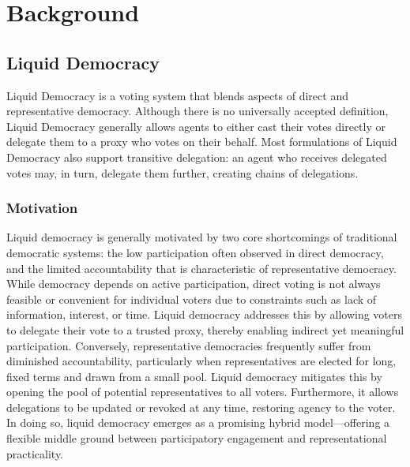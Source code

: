 \graphicspath{{../figures/}}

\chapter{Background}
\label{chap:background}

\section{Liquid Democracy}

Liquid Democracy is a voting system that blends aspects of direct and representative democracy. Although there is no universally accepted definition, Liquid Democracy generally allows agents to either cast their votes directly or delegate them to a proxy who votes on their behalf. Most formulations of Liquid Democracy also support transitive delegation: an agent who receives delegated votes may, in turn, delegate them further, creating chains of delegations. \cite{degraveResolvingMultiproxyTransitive2014, boldiViscousDemocracySocial2011, revel2022liquid, bersetcheGeneralizingLiquidDemocracy2022}

\subsection{Motivation}

Liquid democracy is generally motivated by two core shortcomings of traditional democratic systems: the low participation often observed in direct democracy, and the limited accountability that is characteristic of representative democracy. \cite{fordDelegativeDemocracy2002, brillInteractiveDemocracy2018} While democracy depends on active participation, direct voting is not always feasible or convenient for individual voters due to constraints such as lack of information, interest, or time. Liquid democracy addresses this by allowing voters to delegate their vote to a trusted proxy, thereby enabling indirect yet meaningful participation. Conversely, representative democracies frequently suffer from diminished accountability, particularly when representatives are elected for long, fixed terms and drawn from a small pool. Liquid democracy mitigates this by opening the pool of potential representatives to all voters. Furthermore, it allows delegations to be updated or revoked at any time, restoring agency to the voter. \cite{brillInteractiveDemocracy2018} In doing so, liquid democracy emerges as a promising hybrid model—offering a flexible middle ground between participatory engagement and representational practicality.

